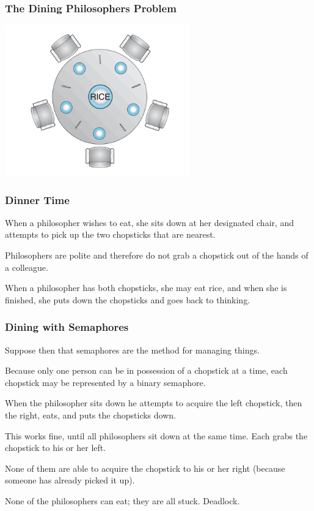 \begin{frame}
	\frametitle{The Dining Philosophers Problem}

	\begin{center}
		\includegraphics[width=0.6\textwidth]{images/philosopher-table.png}
	\end{center}

\end{frame}

\begin{frame}
	\frametitle{Dinner Time}

	When a philosopher wishes to eat, she sits down at her designated chair, and attempts to pick up the two chopsticks that are nearest.

	Philosophers are polite and therefore do not grab a chopstick out of the hands of a colleague.

	When a philosopher has both chopsticks, she may eat rice, and when she is finished, she puts down the chopsticks and goes back to thinking.


\end{frame}

\begin{frame}
	\frametitle{Dining with Semaphores}

	Suppose then that semaphores are the method for managing things.

	Because only one person can be in possession of a chopstick at a time, each chopstick may be represented by a binary semaphore.

	When the philosopher sits down he attempts to acquire the left chopstick, then the right, eats, and puts the chopsticks down.

	This works fine, until all philosophers sit down at the same time. Each grabs the chopstick to his or her left.

	None of them are able to acquire the chopstick to his or her right (because someone has already picked it up).

	None of the philosophers can eat; they are all stuck. Deadlock.

\end{frame}

